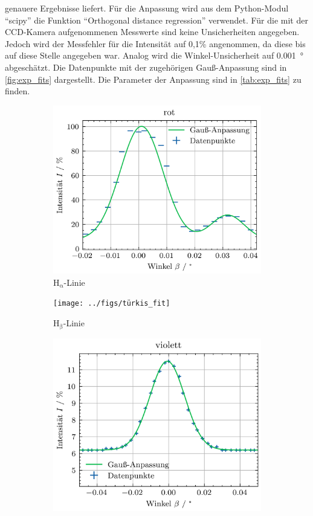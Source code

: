 genauere Ergebnisse liefert. Für die Anpassung wird aus dem Python-Modul \enquote{scipy} die Funktion \enquote{Orthogonal distance regression} verwendet.
Für die mit der CCD-Kamera aufgenommenen Messwerte sind keine Unsicherheiten angegeben. Jedoch wird der Messfehler für die Intensität auf 0,1\% angenommen, da diese
bis auf diese Stelle angegeben war. Analog wird die Winkel-Unsicherheit auf \SI{0,001}{\degree} abgeschätzt. Die Datenpunkte mit der zugehörigen Gauß-Anpassung sind
in \cref{fig:exp_fits} dargestellt. Die Parameter der Anpassung sind in \cref{tab:exp_fits} zu finden.
\begin{figure}[H]
    \centering
    \begin{subfigure}{0.45\textwidth}
        \centering
        \includegraphics[scale=0.5]{../figs/rot_fit}
        \caption{$\mathrm{H_{\alpha}}$-Linie}
    \end{subfigure}
    \begin{subfigure}{0.45\textwidth}
        \centering
        \texttt{[image: ../figs/türkis\_fit]}
        \caption{$\mathrm{H_{\beta}}$-Linie}
    \end{subfigure}
    \begin{subfigure}{0.45\textwidth}
        \centering
        \includegraphics[scale=0.5]{../figs/lila_fit}

\end{subfigure}
\end{figure}
